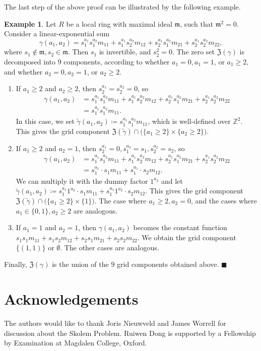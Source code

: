 \documentclass[letterpaper, 11pt, thm-restate]{article}
\numberwithin{equation}{section}
\newcommand{\Z}{\mathbb{Z}}
\newcommand{\mZ}{\mathfrak{Z}}
\newcommand{\frm}{\mathfrak{m}}
\theoremstyle{definition}
\theoremstyle{definition}
\newtheorem{example}[theorem]{Example}
\theoremstyle{definition}
\begin{document}
The last step of the above proof can be illustrated by the following example.
\begin{example}
    Let $R$ be a local ring with maximal ideal $\frm$, such that $\frm^2 = 0$.
    Consider a linear-exponential sum
    \[
    \gamma(a_1, a_2) = s_1^{a_1} s_1^{a_2} m_{11} + s_1^{a_1} s_2^{a_2} m_{12} + s_2^{a_1} s_1^{a_2} m_{21} + s_2^{a_1} s_2^{a_2} m_{22},
    \]
    where $s_1 \notin \frm, s_2 \in \frm$.
    Then $s_1$ is invertible, and $s_2^2 = 0$.
    The zero set $\mZ(\gamma)$ is decomposed into $9$ components, according to whether $a_1 = 0, a_1 = 1$, or $a_1 \geq 2$, and whether $a_2 = 0, a_2 = 1$, or $a_2 \geq 2$.
    \begin{enumerate}[label = (\roman*)]
        \item If $a_1 \geq 2$ and $a_2 \geq 2$, then $s_2^{a_1} = s_2^{a_2} = 0$, so
        \begin{align*}
            \gamma(a_1, a_2) & = s_1^{a_1} s_1^{a_2} m_{11} + s_1^{a_1} s_2^{a_2} m_{12} + s_2^{a_1} s_1^{a_2} m_{21} + s_2^{a_1} s_2^{a_2} m_{22} \\
            & = s_1^{a_1} s_1^{a_2} m_{11}.
        \end{align*}
        In this case, we set $\tilde \gamma(a_1, a_2) \coloneqq s_1^{a_1} s_1^{a_2} m_{11}$, which is well-defined over $\Z^2$.
        This gives the grid component $\mZ(\tilde\gamma) \cap \big(\{a_1 \geq 2\} \times \{a_2 \geq 2\}\big)$.
        \item If $a_1 \geq 2$ and $a_2 = 1$, then $s_2^{a_1} = 0, s_1^{a_2} = s_1, s_2^{a_2} = s_2$, so
        \begin{align*}
            \gamma(a_1, a_2) & = s_1^{a_1} s_1^{a_2} m_{11} + s_1^{a_1} s_2^{a_2} m_{12} + s_2^{a_1} s_1^{a_2} m_{21} + s_2^{a_1} s_2^{a_2} m_{22} \\
            & = s_1^{a_1} \cdot s_1 m_{11} + s_1^{a_1} \cdot s_2 m_{12}.
        \end{align*}
        We can multiply it with the dummy factor $1^{a_2}$ and let $\tilde\gamma(a_1, a_2) \coloneqq s_1^{a_1} 1^{a_2} \cdot s_1 m_{11} + s_1^{a_1} 1^{a_2} \cdot s_2 m_{12}$.
        This gives the grid component $\mZ(\tilde\gamma) \cap \big(\{a_1 \geq 2\} \times \{1\}\big)$.
        The case where $a_1 \geq 2, a_2 = 0$, and the cases where $a_1 \in \{0, 1\}, a_2 \geq 2$ are analogous.
        \item If $a_1 = 1$ and $a_2 = 1$, then $\gamma(a_1, a_2)$ becomes the constant function $s_1 s_1 m_{11} + s_1 s_2 m_{12} + s_2 s_1 m_{21} + s_2 s_2 m_{22}$. We obtain the grid component $\{(1, 1)\}$ or $\emptyset$. The other cases are analogous.
    \end{enumerate}
    Finally, $\mZ(\gamma)$ is the union of the $9$ grid components obtained above.
    \hfill $\blacksquare$
\end{example}

\section*{Acknowledgements} The authors would like to thank Joris Nieuwveld and James Worrell for discussion about the Skolem Problem. Ruiwen Dong is supported by a Fellowship by Examination at Magdalen College, Oxford.


\end{document}
